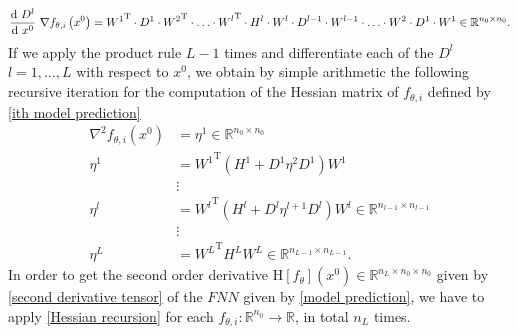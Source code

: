 \begin{equation*}
    \frac{\textup{d} \ D^{l}}{\textup{d} \ x^0} \  \nabla f_{\theta, i} \left(x^0\right) = {W^{1}}^{\mathrm{T}} \cdot D^{1} \cdot {W^{2}}^{\mathrm{T}} \cdot \ldots \cdot {W^{l}}^{\mathrm{T}} \cdot H^{l} \cdot W^l \cdot D^{l-1} \cdot W^{l-1} \cdot \ldots \cdot W^2 \cdot D^1 \cdot W^{1} \in \mathbb{R}^{n_{0} \times n_0}.
\end{equation*}
If we apply the product rule $L-1$ times and differentiate each of the $D^l$ $l = 1, \ldots, L$ with respect to $x^0$, we obtain by simple arithmetic the following recursive iteration for the computation of the Hessian matrix of $f_{\theta, i}$ defined by \cref{ith model prediction} 
\begin{equation}
    \label{Hessian recursion}
    \begin{aligned}
        \nabla^{2} f_{\theta, i} \left(x^0\right) & = \eta^{1} \in \mathbb{R}^{n_0 \times n_0} \\
        \eta^{1} & = {W^{1}}^{\mathrm{T}} \left( H^{1} + D^{1} \eta^{2} D^{1} \right) W^{1} \\
        & \vdots \\
        \eta^{l} & = {W^{l}}^{\mathrm{T}} \left( H^{l} + D^{l} \eta^{l+1} D^{l} \right) W^{l} \in \mathbb{R}^{n_{l-1} \times n_{l-1}} \\
        & \vdots \\
        \eta^{L} & = {W^L}^{\mathrm{T}} H^{L} W^L \in \mathbb{R}^{n_{L-1} \times n_{L-1}}.
    \end{aligned}
\end{equation}
In order to get the second order derivative $\mathrm{H} \left[f_{\theta} \right]\left(x^0\right) \in \mathbb{R}^{n_L \times n_0 \times n_0}$ given by \cref{second derivative tensor} of the $FNN$ given by \cref{model prediction}, we have to apply \cref{Hessian recursion} for each $f_{\theta, i} \colon \mathbb{R}^{n_0} \to \mathbb{R}$, in total $n_L$ times.  \\


